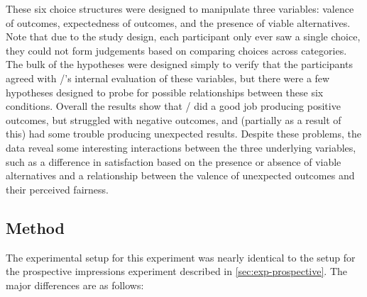 These six choice structures were designed to manipulate three variables: valence of outcomes, expectedness of outcomes, and the presence of viable alternatives.
%
Note that due to the study design, each participant only ever saw a single choice, they could not form judgements based on comparing choices across categories.
%
The bulk of the hypotheses were designed simply to verify that the participants agreed with \dunyazad/'s internal evaluation of these variables, but there were a few hypotheses designed to probe for possible relationships between these six conditions.
%
Overall the results show that \dunyazad/ did a good job producing positive outcomes, but struggled with negative outcomes, and (partially as a result of this) had some trouble producing unexpected results.
%
Despite these problems, the data reveal some interesting interactions between the three underlying variables, such as a difference in satisfaction based on the presence or absence of viable alternatives and a relationship between the valence of unexpected outcomes and their perceived fairness.


\subsection{Method}

The experimental setup for this experiment was nearly identical to the setup for the prospective impressions experiment described in \cref{sec:exp-prospective}.
%
The major differences are as follows:

